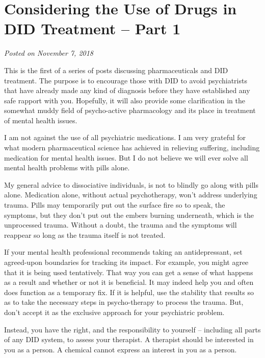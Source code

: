 \documentclass[]{book}
\begin{document}
\hypertarget{considering-the-use-of-drugs-in-did-treatment-part-1}{%
\section{Considering the Use of Drugs in DID Treatment -- Part 1}\label{considering-the-use-of-drugs-in-did-treatment-part-1}}

\emph{Posted on November 7, 2018}

This is the first of a series of posts discussing pharmaceuticals and DID treatment. The purpose is to encourage those with DID to avoid psychiatrists that have already made any kind of diagnosis before they have established any safe rapport with you. Hopefully, it will also provide some clarification in the somewhat muddy field of psycho-active pharmacology and its place in treatment of mental health issues.

I am not against the use of all psychiatric medications. I am very grateful for what modern pharmaceutical science has achieved in relieving suffering, including medication for mental health issues. But I do not believe we will ever solve all mental health problems with pills alone.

My general advice to dissociative individuals, is not to blindly go along with pills alone. Medication alone, without actual psychotherapy, won't address underlying trauma. Pills may temporarily put out the surface fire so to speak, the symptoms, but they don't put out the embers burning underneath, which is the unprocessed trauma. Without a doubt, the trauma and the symptoms will reappear so long as the trauma itself is not treated.

If your mental health professional recommends taking an antidepressant, set agreed-upon boundaries for tracking its impact. For example, you might agree that it is being used tentatively. That way you can get a sense of what happens as a result and whether or not it is beneficial. It may indeed help you and often does function as a temporary fix. If it is helpful, use the stability that results so as to take the necessary steps in psycho-therapy to process the trauma. But, don't accept it as the exclusive approach for your psychiatric problem.

Instead, you have the right, and the responsibility to yourself -- including all parts of any DID system, to assess your therapist. A therapist should be interested in you as a person. A chemical cannot express an interest in you as a person.
\end{document}
